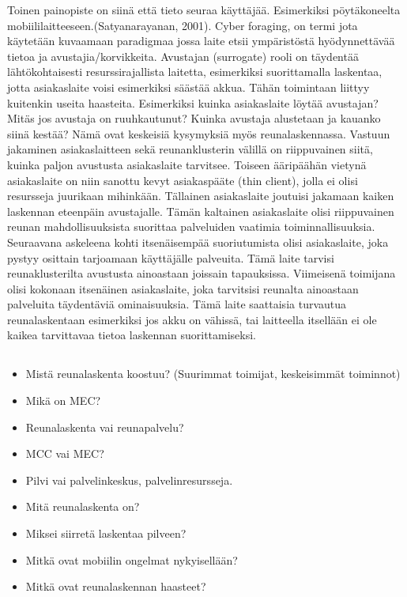 \documentclass[finnish]{tktltiki2}
\theoremstyle{definition}
\theoremstyle{remark}
\begin{document}
Toinen painopiste on siinä että tieto seuraa käyttäjää. Esimerkiksi pöytäkoneelta mobiililaitteeseen.(Satyanarayanan, 2001).
Cyber foraging, on termi jota käytetään kuvaamaan paradigmaa jossa laite etsii ympäristöstä hyödynnettävää tietoa ja avustajia/korvikkeita. Avustajan (surrogate) rooli on täydentää lähtökohtaisesti resurssirajallista laitetta, esimerkiksi suorittamalla laskentaa, jotta asiakaslaite voisi esimerkiksi säästää akkua.
Tähän toimintaan liittyy kuitenkin useita haasteita. Esimerkiksi kuinka asiakaslaite löytää avustajan? Mitäs jos avustaja on ruuhkautunut? Kuinka avustaja alustetaan ja kauanko siinä kestää? 
Nämä ovat keskeisiä kysymyksiä myös reunalaskennassa. 
Vastuun jakaminen asiakaslaitteen sekä reunanklusterin välillä on riippuvainen siitä, kuinka paljon avustusta asiakaslaite tarvitsee. 
Toiseen ääripäähän vietynä asiakaslaite on niin sanottu kevyt asiakaspääte (thin client), jolla ei olisi resursseja juurikaan mihinkään. Tällainen asiakaslaite joutuisi jakamaan kaiken laskennan eteenpäin avustajalle. 
Tämän kaltainen asiakaslaite olisi riippuvainen reunan mahdollisuuksista suorittaa palveluiden vaatimia toiminnallisuuksia. 
Seuraavana askeleena kohti itsenäisempää suoriutumista olisi asiakaslaite, joka pystyy osittain tarjoamaan käyttäjälle palveuita. Tämä laite tarvisi reunaklusterilta avustusta ainoastaan joissain tapauksissa. 
Viimeisenä toimijana olisi kokonaan itsenäinen asiakaslaite, joka tarvitsisi reunalta ainoastaan palveluita täydentäviä ominaisuuksia.
Tämä laite saattaisia turvautua reunalaskentaan esimerkiksi jos akku on vähissä, tai laitteella itsellään ei ole kaikea tarvittavaa tietoa laskennan suorittamiseksi.

\subsection{}
\begin{itemize}
\item Mistä reunalaskenta koostuu? (Suurimmat toimijat, keskeisimmät toiminnot)
\item Mikä on MEC?
\item Reunalaskenta vai reunapalvelu?
\item MCC vai MEC?
\item Pilvi vai palvelinkeskus, palvelinresursseja.
\item Mitä reunalaskenta on?
\item Miksei siirretä laskentaa pilveen?
\item Mitkä ovat mobiilin ongelmat nykyisellään?
\item Mitkä ovat reunalaskennan haasteet?
\end{itemize}
\end{document}
